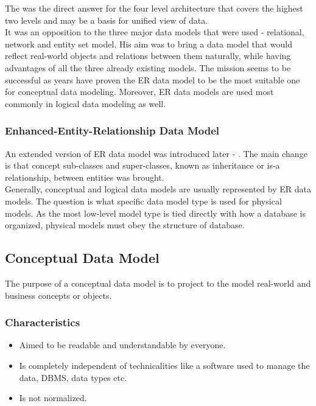 The  was the direct answer for the four level architecture\cite{Chen76theentity-relationship} that covers the highest two levels and may be a basis for unified view of data. \\
It was an opposition to the three major data models that were used - relational, network and entity set model. His aim was to bring a data model that would reflect real-world objects and relations between them naturally, while having advantages of all the three already existing models. The mission seems to be successful as years have proven the ER data model to be the most suitable one for conceptual data modeling. Moreover, ER data models are used most commonly in logical data modeling as well.

\subsubsection{Enhanced-Entity-Relationship Data Model}

An extended version of ER data model was introduced later - . The main change is that concept sub-classes and super-classes, known as inheritance or is-a relationship, between entities was brought. \\ 

Generally, conceptual and logical data models are usually represented by ER data models. 
The question is what specific data model type is used for physical models. 
As the most low-level model type is tied directly with how a database is organized, physical models must obey the structure of database.

\subsection{Conceptual Data Model}

The purpose of a conceptual data model is to project to the model real-world and business concepts or objects. \\

\subsubsection{Characteristics}
\begin{itemize}
	\item Aimed to be readable and understandable by everyone.
	\item Is completely independent of technicalities like a software used to manage the data, DBMS, data types etc.
	\item Is not normalized.
\end{itemize}

